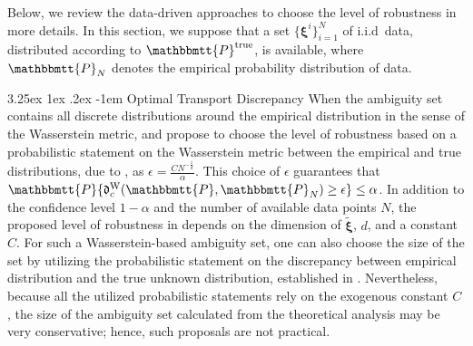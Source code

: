 \documentclass[final,onefignum,onetabnum]{class}
\makeatletter
\renewcommand\paragraph{\@startsection{paragraph}{4}{\z@}%
  {3.25ex \@plus1ex \@minus.2ex}%
  {-1em}%
  {\normalfont\normalsize\bfseries}}
\newcommand{\bs}[1]{\boldsymbol{#1}} %
\newcommand{\Ts}[1]{\mathbbmtt{#1}} %
\newcommand{\Fs}[1]{\mathfrak{#1}} %
\newcommand{\txi}{\tilde{\bs{\xi}}}
\newcommand{\trueP}{\Ts{P}^{\text{true}}}
\makeatother
\begin{document}
Below, we review the data-driven approaches to choose the level of robustness in more details. 
In this section, we suppose that a set  $\{\bs{\xi}^{i}\}_{i=1}^{N}$ of i.i.d\ data, distributed according to $\trueP$, is available, where $\Ts{P}_{N}$ denotes the empirical probability distribution of data. 

\paragraph{Optimal Transport Discrepancy}
When the ambiguity set contains all discrete distributions around the empirical distribution in the sense of the Wasserstein metric,  \citet{pflug2007} and \citet{pflug2012} propose to choose the level of robustness based on a probabilistic statement on the Wasserstein metric between the empirical and true distributions, due to \citet{dudley1969}, as $\epsilon=\frac{C N^{-\frac{1}{d}}}{\alpha}$. %
This choice of $\epsilon$ guarantees that $\Ts{P}\{ \Fs{d}^{\text{W}}_{c} (\Ts{P}, \Ts{P}_{N}) \ge \epsilon\} \le \alpha$. 
In addition to the confidence level $1-\alpha$ and  the number of available data points $N$, the proposed level of robustness in \citep{pflug2007,pflug2012}  depends on the dimension of $\txi$, $d$, and a constant $C$.
For such a Wasserstein-based ambiguity set, one can also choose the size of the set  by utilizing the probabilistic statement  on the discrepancy between  empirical distribution and the true unknown distribution, established in \citet{fournier2015}. 
Nevertheless, because all the utilized probabilistic statements rely on the exogenous constant $C$, the size of the ambiguity set calculated from the theoretical analysis may be very conservative; hence,  such proposals are not practical.
\end{document}
